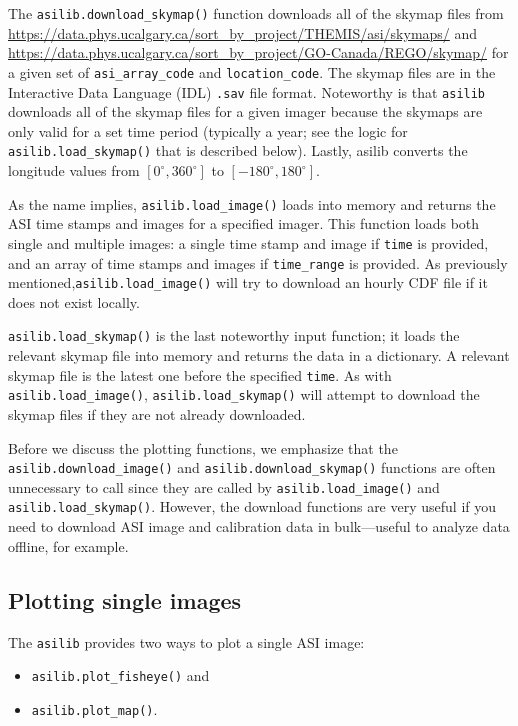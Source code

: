 \documentclass[draft]{agujournal2019}
\begin{document}
The \verb|asilib.download_skymap()| function downloads all of the skymap files from \url{https://data.phys.ucalgary.ca/sort_by_project/THEMIS/asi/skymaps/} and \url{https://data.phys.ucalgary.ca/sort_by_project/GO-Canada/REGO/skymap/} for a given set of \verb|asi_array_code| and \verb|location_code|. The skymap files are in the Interactive Data Language (IDL) \verb|.sav| file format. Noteworthy is that \verb|asilib| downloads all of the skymap files for a given imager because the skymaps are only valid for a set time period (typically a year; see the logic for \verb|asilib.load_skymap()| that is described below). Lastly, asilib converts the longitude values from $[0^\circ, 360^\circ]$ to $[-180^\circ, 180^\circ]$.

As the name implies, \verb|asilib.load_image()| loads into memory and returns the ASI time stamps and images for a specified imager. This function loads both single and multiple images: a single time stamp and image if \verb|time| is provided, and an array of time stamps and images if \verb|time_range| is provided. As previously mentioned,\verb|asilib.load_image()| will try to download an hourly CDF file if it does not exist locally.

\verb|asilib.load_skymap()| is the last noteworthy input function; it loads the relevant skymap file into memory and returns the data in a dictionary. A relevant skymap file is the latest one before the specified \verb|time|. As with \verb|asilib.load_image()|, \verb|asilib.load_skymap()| will attempt to download the skymap files if they are not already downloaded.

Before we discuss the plotting functions, we emphasize that the \verb|asilib.download_image()| and \verb|asilib.download_skymap()| functions are often unnecessary to call since they are called by \verb|asilib.load_image()| and \verb|asilib.load_skymap()|. However, the download functions are very useful if you need to download ASI image and calibration data in bulk---useful to analyze data offline, for example.

\subsection{Plotting single images}

The \verb|asilib| provides two ways to plot a single ASI image:

\begin{itemize}
      \item \verb|asilib.plot_fisheye()| and
      \item \verb|asilib.plot_map()|.
\end{itemize}
\end{document}
